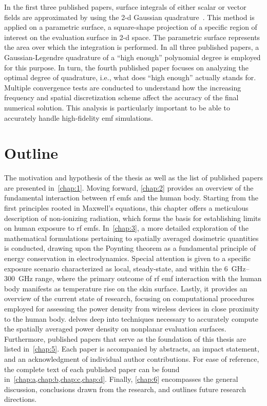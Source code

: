 In the first three published papers, surface integrals of either scalar or vector fields are approximated by using the \gls{2-d} Gaussian quadrature~\cite{Abramowitz1972Handbook}.
This method is applied on a parametric surface, a square-shape projection of a specific region of interest on the evaluation surface in \gls{2-d} space.
The parametric surface represents the area over which the integration is performed.
In all three published papers, a Gaussian-Legendre quadrature of a ``high enough'' polynomial degree is employed for this purpose.
In turn, the fourth published paper focuses on analyzing the optimal degree of quadrature, i.e., what does ``high enough'' actually stands for.
Multiple convergence tests are conducted to understand how the increasing frequency and spatial discretization scheme affect the accuracy of the final numerical solution.
This analysis is particularly important to be able to accurately handle high-fidelity \gls{emf} simulations.

\section{Outline}
\label{sec:outline}
The motivation and hypothesis of the thesis as well as the list of published papers are presented in~\cref{chap:1}.
Moving forward, \cref{chap:2} provides an overview of the fundamental interaction between \gls{rf} \gls{emf}s and the human body.
Starting from the first principles rooted in Maxwell's equations, this chapter offers a meticulous description of non-ionizing radiation, which forms the basis for establishing limits on human exposure to \gls{rf} \gls{emf}s.
In~\cref{chap:3}, a more detailed exploration of the mathematical formulations pertaining to spatially averaged dosimetric quantities is conducted, drawing upon the Poynting theorem as a fundamental principle of energy conservation in electrodynamics. 
Special attention is given to a specific exposure scenario characterized as local, steady-state, and within the \SIrange{6}{300}{\GHz} range, where the primary outcome of \gls{rf} \gls{emf} interaction with the human body manifests as temperature rise on the skin surface.
Lastly, it provides an overview of the current state of research, focusing on computational procedures employed for assessing the power density from wireless devices in close proximity to the human body.
 delves deep into techniques necessary to accurately compute the spatially averaged power density on nonplanar evaluation surfaces.
Furthermore, published papers that serve as the foundation of this thesis are listed in~\cref{chap:5}. 
Each paper is accompanied by abstracts, an impact statement, and an acknowledgment of individual author contributions.
For ease of reference, the complete text of each published paper can be found in~\cref{chap:a,chap:b,chap:c,chap:d}.
Finally, \cref{chap:6} encompasses the general discussion, conclusions drawn from the research, and outlines future research directions.
